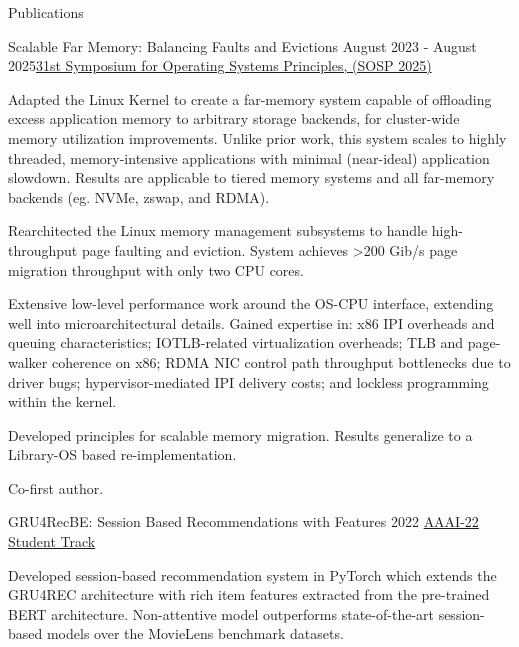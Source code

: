 \documentclass{resume} %
\begin{document}
\begin{resumeSection}{Publications}
	
\begin{resumeSubsection}{Scalable Far Memory: Balancing Faults and Evictions}
	{August 2023 - August 2025}{\href{https://dl.acm.org/doi/10.1145/3731569.3764842}{31st Symposium for Operating Systems Principles, (SOSP 2025)}}{}
\item Adapted the Linux Kernel to create a far-memory system capable of offloading 
	excess application memory to arbitrary storage backends, for cluster-wide
	memory utilization improvements. 
	Unlike prior work, this system scales to highly threaded, memory-intensive
	applications with minimal (near-ideal) application slowdown. 
	Results are applicable to tiered memory systems and all far-memory backends
	(eg. NVMe, zswap, and RDMA). 
\item Rearchitected the Linux memory management subsystems to handle high-throughput
	page faulting and eviction. System achieves \textgreater 200 Gib/s page migration
	throughput with only two CPU cores. 
\item Extensive low-level performance work around the OS-CPU interface, 
	extending well into microarchitectural details. Gained expertise in:
	x86 IPI overheads and queuing characteristics; 
	IOTLB-related virtualization overheads; 
	TLB and page-walker coherence on x86; 
	RDMA NIC control path throughput bottlenecks due to driver bugs; 
	hypervisor-mediated IPI delivery costs; 
	and lockless programming within the kernel. 
\item Developed principles for scalable memory migration. 
	Results generalize to a Library-OS based re-implementation. 
\item Co-first author. 
\end{resumeSubsection}

\begin{resumeSubsection}{GRU4RecBE: Session Based Recommendations with Features}
	{2022}
	{\href{https://ojs.aaai.org/index.php/AAAI/article/view/21651/21400}{AAAI-22 Student Track}}
	{}{}
\item Developed session-based recommendation system in PyTorch which
	extends the GRU4REC architecture with rich item features extracted from
	the pre-trained BERT architecture. Non-attentive model outperforms
	state-of-the-art session-based models over the MovieLens benchmark datasets.
\end{resumeSubsection}

\end{resumeSection}
\end{document}
